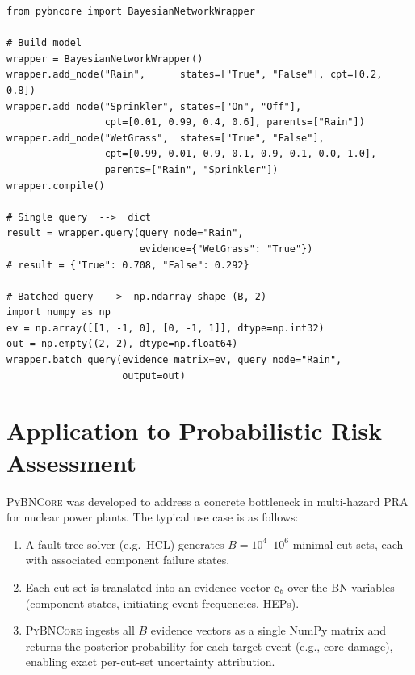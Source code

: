 \documentclass[11pt, letterpaper]{article}
\newcommand{\bncore}{\textsc{PyBNCore}}
\theoremstyle{definitionstyle}
\begin{document}
\begin{lstlisting}[style=pythonstyle, caption={Minimal end-to-end example}]
from pybncore import BayesianNetworkWrapper

# Build model
wrapper = BayesianNetworkWrapper()
wrapper.add_node("Rain",      states=["True", "False"], cpt=[0.2, 0.8])
wrapper.add_node("Sprinkler", states=["On", "Off"],
                 cpt=[0.01, 0.99, 0.4, 0.6], parents=["Rain"])
wrapper.add_node("WetGrass",  states=["True", "False"],
                 cpt=[0.99, 0.01, 0.9, 0.1, 0.9, 0.1, 0.0, 1.0],
                 parents=["Rain", "Sprinkler"])
wrapper.compile()

# Single query  -->  dict
result = wrapper.query(query_node="Rain",
                       evidence={"WetGrass": "True"})
# result = {"True": 0.708, "False": 0.292}

# Batched query  -->  np.ndarray shape (B, 2)
import numpy as np
ev = np.array([[1, -1, 0], [0, -1, 1]], dtype=np.int32)
out = np.empty((2, 2), dtype=np.float64)
wrapper.batch_query(evidence_matrix=ev, query_node="Rain",
                    output=out)
\end{lstlisting}


\section{Application to Probabilistic Risk Assessment}
\label{sec:pra}

\bncore{} was developed to address a concrete bottleneck in multi-hazard
PRA for nuclear power plants. The typical use case is as follows:

\begin{enumerate}[itemsep=3pt]
  \item A fault tree solver (e.g.\ HCL) generates $B = 10^4$--$10^6$
        minimal cut sets, each with associated component failure states.
  \item Each cut set is translated into an evidence vector $\mathbf{e}_b$
        over the BN variables (component states, initiating event
        frequencies, HEPs).
  \item \bncore{} ingests all $B$ evidence vectors as a single NumPy
        matrix and returns the posterior probability for each
        target event (e.g., core damage), enabling exact per-cut-set
        uncertainty attribution.
\end{enumerate}
\end{document}
